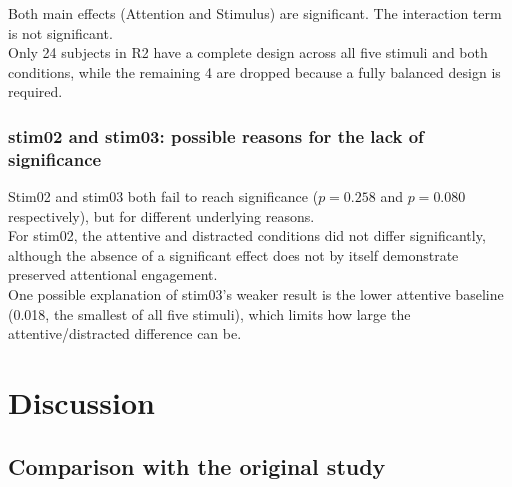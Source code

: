 \documentclass[pdflatex,sn-mathphys-num]{sn-jnl}%
\theoremstyle{thmstyleone}%
\theoremstyle{thmstyletwo}%
\theoremstyle{thmstylethree}%
\begin{document}
Both main effects (Attention and Stimulus) are significant.
The interaction term is not significant.\\
Only 24 subjects in R2 have a complete design across all five stimuli and both conditions, while the remaining 4 are dropped because a fully balanced design is required.

\subsubsection{stim02 and stim03: possible reasons for the lack of significance}\label{subsec8}

Stim02 and stim03 both fail to reach significance ($p=0.258$ and $p=0.080$ respectively), but for different underlying reasons.\\
For stim02, the attentive and distracted conditions did not differ significantly, although the absence of a significant effect does not by itself demonstrate preserved attentional engagement.\\
One possible explanation of stim03's weaker result is the lower attentive baseline (0.018, the smallest of all five stimuli), which limits how large the attentive/distracted difference can be.


\section{Discussion}\label{sec6}


\subsection{Comparison with the original study}\label{subsec9}
\end{document}
